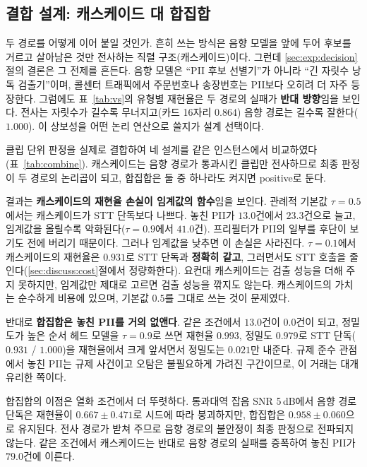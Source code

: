 \documentclass[10pt,twocolumn]{article}
\renewcommand{\emph}[1]{\textbf{#1}}
\begin{document}
\subsection{결합 설계: 캐스케이드 대 합집합}\label{sec:discuss:combine}
두 경로를 어떻게 이어 붙일 것인가. 흔히 쓰는 방식은 음향 모델을 앞에 두어 후보를 거르고
살아남은 것만 전사하는 직렬 구조(캐스케이드)이다. 그런데 \ref{sec:exp:decision}절의 결론은 그
전제를 흔든다. 음향 모델은 ``PII 후보 선별기''가
아니라 ``긴 자릿수 낭독 검출기''이며, 콜센터 트래픽에서 주문번호나 송장번호는 PII보다 오히려 더
자주 등장한다. 그럼에도 표~\ref{tab:vs}의 유형별 재현율은 두 경로의 실패가 \emph{반대 방향}임을
보인다. 전사는 자릿수가 길수록 무너지고(카드 16자리 $0.864$) 음향 경로는 길수록 잘한다($1.000$).
이 상보성을 어떤 논리 연산으로 쓸지가 설계 선택이다.

클립 단위 판정을 실제로 결합하여 네 설계를 같은 인스턴스에서 비교하였다(표~\ref{tab:combine}).
캐스케이드는 음향 경로가 통과시킨 클립만 전사하므로 최종 판정이 두 경로의 논리곱이 되고, 합집합은
둘 중 하나라도 켜지면 positive로 둔다.

결과는 \emph{캐스케이드의 재현율 손실이 임계값의 함수}임을 보인다. 관례적 기본값 $\tau=0.5$에서는
캐스케이드가 STT 단독보다 나쁘다. 놓친 PII가 $13.0$건에서 $23.3$건으로 늘고, 임계값을 올릴수록
악화된다($\tau=0.9$에서 $41.0$건). 프리필터가 PII의 일부를 후단이 보기도 전에 버리기 때문이다.
그러나 임계값을 낮추면 이 손실은 사라진다. $\tau=0.1$에서 캐스케이드의 재현율은 $0.931$로 STT
단독과 \emph{정확히 같고}, 그러면서도 STT 호출을 줄인다(\ref{sec:discuss:cost}절에서 정량화한다).
요컨대 캐스케이드는 검출 성능을 더해 주지 못하지만, 임계값만 제대로 고르면 검출 성능을 깎지도
않는다. 캐스케이드의 가치는 순수하게 비용에 있으며, 기본값 $0.5$를 그대로 쓰는 것이 문제였다.

반대로 \emph{합집합은 놓친 PII를 거의 없앤다}. 같은 조건에서 $13.0$건이 $0.0$건이 되고, 정밀도가
높은 순서 헤드 모델을 $\tau=0.9$로 쓰면 재현율 $0.993$, 정밀도 $0.979$로 STT 단독($0.931$ /
$1.000$)을 재현율에서 크게 앞서면서 정밀도는 $0.021$만 내준다. 규제 준수 관점에서 놓친 PII는
규제 사건이고 오탐은 불필요하게 가려진 구간이므로, 이 거래는 대개 유리한 쪽이다.

합집합의 이점은 열화 조건에서 더 뚜렷하다. 통과대역 잡음 SNR 5\,dB에서 음향 경로 단독은 재현율이
$0.667\pm0.471$로 시드에 따라 붕괴하지만, 합집합은 $0.958\pm0.060$으로 유지된다. 전사 경로가
받쳐 주므로 음향 경로의 불안정이 최종 판정으로 전파되지 않는다. 같은 조건에서 캐스케이드는 반대로
음향 경로의 실패를 증폭하여 놓친 PII가 $79.0$건에 이른다.
\end{document}
